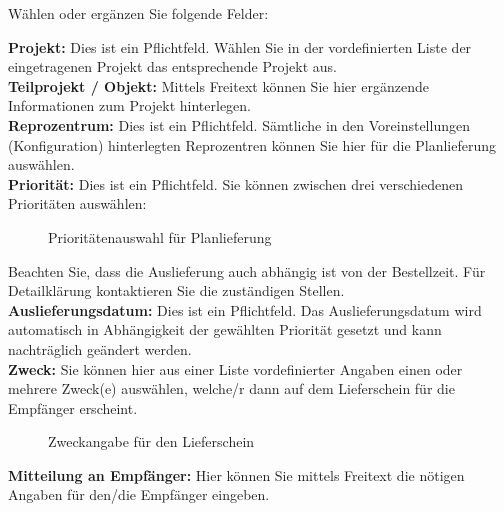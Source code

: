 Wählen oder ergänzen Sie folgende Felder:

\textbf{Projekt:} Dies ist ein Pflichtfeld. Wählen Sie in der vordefinierten Liste der eingetragenen Projekt das entsprechende Projekt aus. \\
\textbf{Teilprojekt / Objekt:} Mittels Freitext können Sie hier ergänzende Informationen zum Projekt hinterlegen. \\
\textbf{Reprozentrum:} Dies ist ein Pflichtfeld. Sämtliche in den Voreinstellungen (Konfiguration) hinterlegten Reprozentren können Sie hier für die Planlieferung auswählen. \\
\textbf{Priorität:} Dies ist ein Pflichtfeld. Sie können zwischen drei verschiedenen Prioritäten auswählen:
\begin{figure}[H]
\caption{Prioritätenauswahl für Planlieferung}
\end{figure}
Beachten Sie, dass die Auslieferung auch abhängig ist von der Bestellzeit. Für Detailklärung kontaktieren Sie die zuständigen Stellen. \\
\textbf{Auslieferungsdatum:} Dies ist ein Pflichtfeld. Das Auslieferungsdatum wird automatisch in Abhängigkeit der gewählten Priorität gesetzt und kann nachträglich geändert werden. \\
\textbf{Zweck:} Sie können hier aus einer Liste vordefinierter Angaben einen oder mehrere Zweck(e) auswählen, welche/r dann auf dem Lieferschein für die Empfänger erscheint.
\begin{figure}[H]
\caption{Zweckangabe für den Lieferschein}
\end{figure}
\textbf{Mitteilung an Empfänger:} Hier können Sie mittels Freitext die nötigen Angaben für den/die Empfänger eingeben. \\
